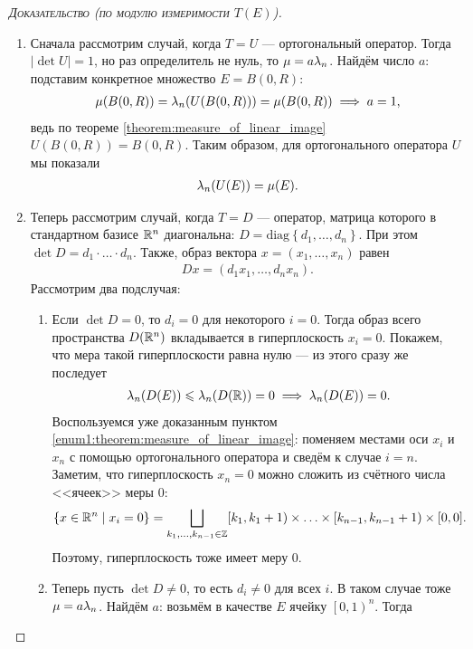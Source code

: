 \begin{proof}[\normalfont\textsc{Доказательство (по модулю измеримости $T(E)$)}]
 \begin{enumerate}
  \item Сначала рассмотрим случай, когда $T = U$ --- ортогональный оператор. Тогда $\left| \det U \right| = 1$, но раз определитель не нуль, то $\mu = a \lambda_n$. Найдём число $a$: подставим конкретное множество $E = B(0, R)$:
   \begin{align*}
    \mu(B(0, R)) = \lambda_n(U(B(0, R))) = \mu(B(0, R)) \implies a = 1
   ,\end{align*} ведь по теореме \ref{theorem:measure_of_linear_image} $U(B(0, R)) = B(0, R)$. Таким образом, для ортогонального оператора $U$ мы показали
   \begin{align*}
    \lambda_n(U(E)) = \mu(E)
   .\end{align*} 
   \label{enum1:theorem:measure_of_linear_image}
  \item Теперь рассмотрим случай, когда $T = D$ --- оператор, матрица которого в стандартном базисе $\mathbb{R}^{n}$ диагональна: $D = \mathrm{diag}\left\{ d_1, \ldots, d_n \right\}$. При этом $\det D = d_1 \cdot \ldots \cdot d_n$. Также, образ вектора $x = (x_1, \ldots, x_n)$ равен
   \begin{align*}
    Dx = (d_1 x_1, \ldots, d_n x_n)
   .\end{align*} Рассмотрим два подслучая:
   \begin{enumerate}
    \item Если $\det D = 0$, то $d_i = 0$ для некоторого $i = 0$. Тогда образ всего пространства $D(\mathbb{R}^{n})$ вкладывается в гиперплоскость $x_i = 0$. Покажем, что мера такой гиперплоскости равна нулю --- из этого сразу же последует
     \begin{align*}
      \lambda_n(D(E)) \leqslant \lambda_n(D(\mathbb{R})) = 0 \implies \lambda_n(D(E)) = 0
     .\end{align*} Воспользуемся уже доказанным пунктом \ref{enum1:theorem:measure_of_linear_image}: поменяем местами оси $x_i$ и $x_n$ с помощью ортогонального оператора и сведём к случае $i = n$. Заметим, что гиперплоскость $x_n = 0$ можно сложить из счётного числа <<ячеек>> меры $0$:
     \begin{align*}
      \left\{ x \in \mathbb{R}^{n} \;\middle|\; x_i = 0 \right\} = \bigsqcup_{k_1, \ldots, k_{n-1} \in \mathbb{Z}}  &[k_1, k_1 + 1) \times \ldots \times \left[k_{n-1}, k_{n-1} + 1\right) \times [0, 0]
     .\end{align*} Поэтому, гиперплоскость тоже имеет меру $0$.
    \item Теперь пусть $\det D \neq 0$, то есть $d_i \neq 0$ для всех $i$. В таком случае тоже $\mu = a \lambda_n$. Найдём $a$: возьмём в качестве $E$ ячейку $\left[0, 1\right)^{n}$. Тогда

\end{enumerate}
\end{enumerate}
\end{proof}
